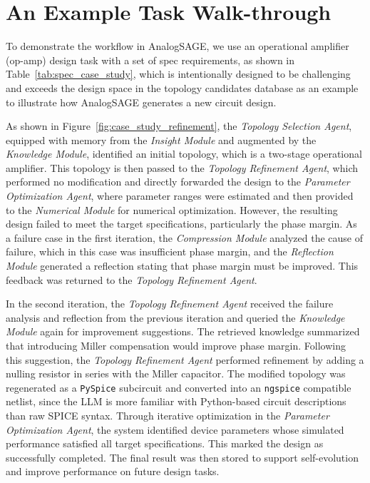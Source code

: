 \section{An Example Task Walk-through}





To demonstrate the workflow in AnalogSAGE, we use an operational amplifier (op-amp) design task with a set of spec requirements, as shown in Table~\ref{tab:spec_case_study}, which is intentionally designed to be challenging and exceeds the design space in the topology candidates database as an example to illustrate how AnalogSAGE generates a new circuit design.

As shown in Figure~\ref{fig:case_study_refinement}, the \emph{Topology Selection Agent}, equipped with memory from the \emph{Insight Module} and augmented by the \emph{Knowledge Module}, identified an initial topology, which is a two-stage operational amplifier. This topology is then passed to the \emph{Topology Refinement Agent}, which performed no modification and directly forwarded the design to the \emph{Parameter Optimization Agent}, where parameter ranges were estimated and then provided to the \emph{Numerical Module} for numerical optimization. However, the resulting design failed to meet the target specifications, particularly the phase margin. As a failure case in the first iteration, the \emph{Compression Module} analyzed the cause of failure, which in this case was insufficient phase margin, and the \emph{Reflection Module} generated a reflection stating that phase margin must be improved. This feedback was returned to the \emph{Topology Refinement Agent}.

In the second iteration, the \emph{Topology Refinement Agent} received the failure analysis and reflection from the previous iteration and queried the \emph{Knowledge Module} again for improvement suggestions. The retrieved knowledge summarized that introducing Miller compensation would improve phase margin. Following this suggestion, the \emph{Topology Refinement Agent} performed refinement by adding a nulling resistor in series with the Miller capacitor. The modified topology was regenerated as a \texttt{PySpice} \cite{PySpice}  subcircuit and converted into an \texttt{ngspice} \cite{sourceforgeNgspice} compatible netlist, since the LLM is more familiar with Python-based circuit descriptions than raw SPICE syntax. 
Through iterative optimization in the \emph{Parameter Optimization Agent}, the system identified device parameters whose simulated performance satisfied all target specifications. This marked the design as successfully completed. The final result was then stored to support self-evolution and improve performance on future design tasks.

